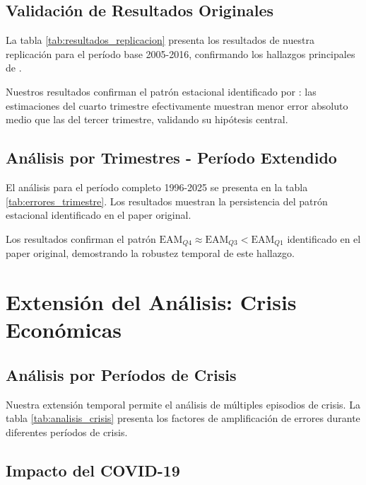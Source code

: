 \documentclass[12pt,a4paper]{article}
\begin{document}
\subsection{Validación de Resultados Originales}

La tabla \ref{tab:resultados_replicacion} presenta los resultados de nuestra replicación para el período base 2005-2016, confirmando los hallazgos principales de \citet{pavia2017}.



Nuestros resultados confirman el patrón estacional identificado por \citet{pavia2017}: las estimaciones del cuarto trimestre efectivamente muestran menor error absoluto medio que las del tercer trimestre, validando su hipótesis central.

\subsection{Análisis por Trimestres - Período Extendido}

El análisis para el período completo 1996-2025 se presenta en la tabla \ref{tab:errores_trimestre}. Los resultados muestran la persistencia del patrón estacional identificado en el paper original.



Los resultados confirman el patrón $\text{EAM}_{Q4} \approx \text{EAM}_{Q3} < \text{EAM}_{Q1}$ identificado en el paper original, demostrando la robustez temporal de este hallazgo.

\section{Extensión del Análisis: Crisis Económicas}

\subsection{Análisis por Períodos de Crisis}

Nuestra extensión temporal permite el análisis de múltiples episodios de crisis. La tabla \ref{tab:analisis_crisis} presenta los factores de amplificación de errores durante diferentes períodos de crisis.



\subsection{Impacto del COVID-19}
\end{document}
